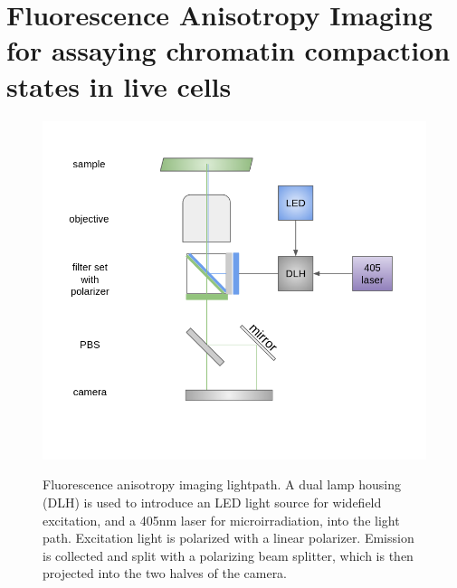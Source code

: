 \chapter{Fluorescence Anisotropy Imaging for assaying chromatin compaction states in live cells}
\begin{figure}[!htp]
    {\hfill\includegraphics[trim=0 50 0 60,clip,width=0.8\linewidth]{figures/setup.png}\hspace*{\fill}}
    \caption{Fluorescence anisotropy imaging lightpath. A dual lamp housing (DLH) is used to introduce an LED light source for widefield excitation, and a 405nm laser for microirradiation, into the light path. Excitation light is polarized with a linear polarizer. Emission is collected and split with a polarizing beam splitter, which is then projected into the two halves of the camera.}
    {\label{fig:setup}}
\end{figure}
